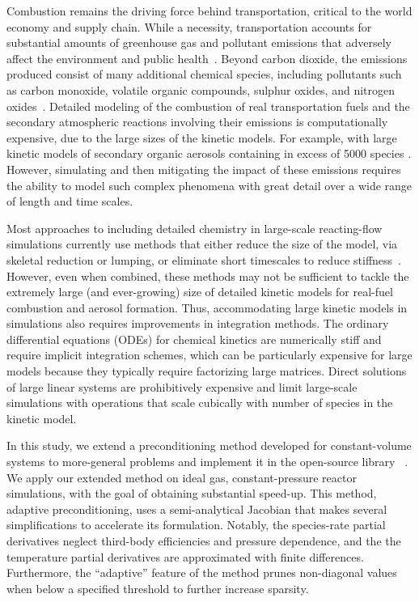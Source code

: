 \documentclass[twocolumn,10pt]{article}
\newcommand{\revised}[2]{#1}  %
\begin{document}
Combustion remains the driving force behind transportation, critical to the world economy and supply chain.
While a necessity, transportation accounts for substantial amounts of greenhouse gas and pollutant emissions that adversely affect the environment and public health~\cite{van_fan_review_2018, manisalidis_environmental_2020}.
Beyond carbon dioxide, the emissions produced consist of many additional chemical species, including pollutants such as carbon monoxide, volatile organic compounds, sulphur oxides, and nitrogen oxides~\cite{van_fan_review_2018}.
Detailed modeling of the combustion of real transportation fuels and the secondary atmospheric reactions involving their emissions is \revised{computationally}{revThree} expensive, due to the large sizes of the kinetic models.
For example, with large kinetic models of secondary organic aerosols containing in excess of 5000 species \cite{li_modeling_2015}.
However, simulating and then mitigating the impact of these emissions requires the ability to model such complex phenomena \revised{with great detail over a wide range of length and time scales.}{revThree}

Most approaches to including detailed chemistry in large-scale reacting-flow simulations currently use methods that either reduce the size of the model, via skeletal reduction or lumping, or eliminate short timescales to reduce stiffness~\cite{Lu2009, Pepiot2019}.
However, even when combined, these methods may not be sufficient to tackle the extremely large (and ever-growing) size of detailed kinetic models for real-fuel combustion and aerosol formation.
Thus, accommodating large kinetic models in simulations also requires improvements in integration methods.
The ordinary differential equations (ODEs) for chemical kinetics are numerically stiff and require implicit integration schemes, which can be particularly expensive for large models because they \revised{typically}{revThree} require factorizing large matrices.
Direct solutions of large linear systems are prohibitively expensive and limit large-scale simulations with operations that scale cubically with number of species in the kinetic model.

In this study, we extend a preconditioning method developed for constant-volume systems \cite{mcnenly_faster_2015} to more-general problems and implement it in the open-source library \cantera{}~\cite{cantera}.
We apply our extended method on ideal gas, constant-pressure reactor simulations, with the goal of obtaining substantial speed-up.
This method, adaptive preconditioning, uses a semi-analytical Jacobian that makes several simplifications to accelerate its formulation.
Notably, the species-rate partial derivatives neglect third-body efficiencies and pressure dependence, and the
the temperature partial derivatives are approximated with finite differences.
Furthermore, the ``adaptive'' feature of the method prunes non-diagonal values when below a specified threshold to further increase sparsity.
\end{document}
